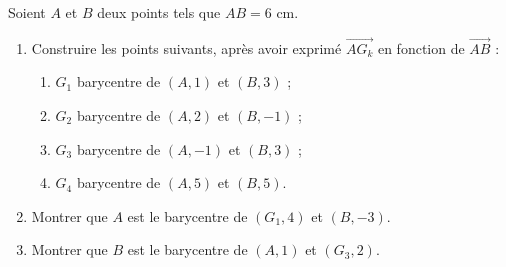 
\newcommand{\R}{\mathbb{R}}
\newcommand{\vect}[1]{\overrightarrow{#1}}

Soient $A$ et $B$ deux points tels que $AB=6$ cm.
\begin{enumerate}
  \item Construire les points suivants, après avoir exprimé $\vect{AG_k}$ en fonction de $\vect{AB}$ :
  \begin{enumerate}
    \item $G_1$ barycentre de $(A,1)$ et $(B,3)$ ;
    \item $G_2$ barycentre de $(A,2)$ et $(B,-1)$ ;
    \item $G_3$ barycentre de $(A,-1)$ et $(B,3)$ ;
    \item $G_4$ barycentre de $(A,5)$ et $(B,5)$.
  \end{enumerate}
  \item Montrer que $A$ est le barycentre de $(G_1,4)$ et $(B,-3)$.
  \item Montrer que $B$ est le barycentre de $(A,1)$ et $(G_3,2)$.
\end{enumerate}


